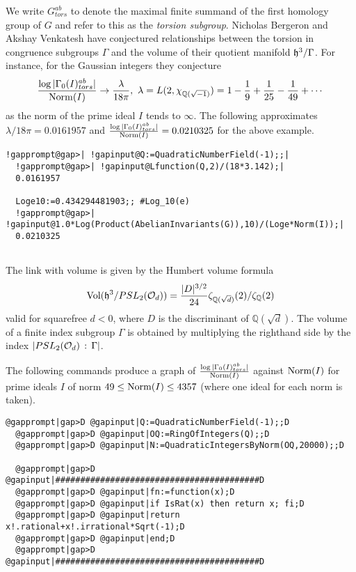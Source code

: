 \documentclass[a4paper,11pt]{report}
\begin{document}
{{\begin{Verbatim}[commandchars=!@|,fontsize=\small,frame=single,label=Example]
\end{Verbatim}
 

We write $G^{ab}_{tors}$ to denote the maximal finite summand of the first homology group of $G$ and refer to this as the \emph{torsion subgroup}. Nicholas Bergeron and Akshay Venkatesh \cite{bergeron} have conjectured relationships between the torsion in congruence subgroups $\Gamma$ and the volume of their quotient manifold ${\frak h}^3/\Gamma$. For instance, for the Gaussian integers they conjecture 
\[ \frac{\log |\Gamma_0(I)_{tors}^{ab}|}{{\rm Norm}(I)} \rightarrow
\frac{\lambda}{18\pi},\ \lambda =L(2,\chi_{\mathbb Q(\sqrt{-1})}) = 1
-\frac{1}{9} + \frac{1}{25} - \frac{1}{49} + \cdots\]
 as the norm of the prime ideal $I$ tends to $\infty$. The following approximates $\lambda/18\pi = 0.0161957$ and $\frac{\log |\Gamma_0(I)_{tors}^{ab}|}{{\rm Norm}(I)} = 0.0210325$ for the above example. 
\begin{Verbatim}[commandchars=!@|,fontsize=\small,frame=single,label=Example]
  !gapprompt@gap>| !gapinput@Q:=QuadraticNumberField(-1);;|
  !gapprompt@gap>| !gapinput@Lfunction(Q,2)/(18*3.142);|
  0.0161957
  
  Loge10:=0.434294481903;; #Log_10(e)
  !gapprompt@gap>| !gapinput@1.0*Log(Product(AbelianInvariants(G)),10)/(Loge*Norm(I));|
  0.0210325
  
\end{Verbatim}
 

 The link with volume is given by the Humbert volume formula 
\[ {\rm Vol} ( {\frak h}^3 / PSL_2( {\cal O}_{d} ) ) = \frac{|D|^{3/2}}{24}
\zeta_{ \mathbb Q( \sqrt{d} ) }(2)/\zeta_{\mathbb Q}(2) \]
 valid for square\texttt{}free $d<0$, where $D$ is the discriminant of $\mathbb Q(\sqrt{d})$. The volume of a finite index subgroup $\Gamma$ is obtained by multiplying the right\texttt{}hand side by the index $|PSL_2({\cal O}_d)\,:\, \Gamma|$. 

 The following commands produce a graph of $ \frac{\log |\Gamma_0(I)_{tors}^{ab}|}{{\rm Norm}(I)}$ against ${\rm Norm}(I)$ for prime ideals $I$ of norm $49 \le {\rm Norm}(I) \le 4357$ (where one ideal for each norm is taken). 
\begin{Verbatim}[commandchars=@|D,fontsize=\small,frame=single,label=Example]
  @gapprompt|gap>D @gapinput|Q:=QuadraticNumberField(-1);;D
  @gapprompt|gap>D @gapinput|OQ:=RingOfIntegers(Q);;D
  @gapprompt|gap>D @gapinput|N:=QuadraticIntegersByNorm(OQ,20000);;D
  
  @gapprompt|gap>D @gapinput|#########################################D
  @gapprompt|gap>D @gapinput|fn:=function(x);D
  @gapprompt|gap>D @gapinput|if IsRat(x) then return x; fi;D
  @gapprompt|gap>D @gapinput|return x!.rational+x!.irrational*Sqrt(-1);D
  @gapprompt|gap>D @gapinput|end;D
  @gapprompt|gap>D @gapinput|#########################################D
  

\end{Verbatim}}}
\end{document}
